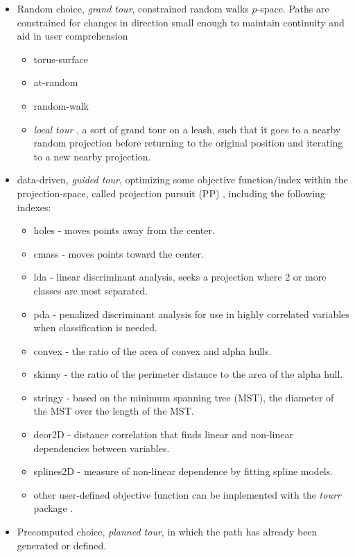 \documentclass{monashthesis}
\begin{document}
\begin{itemize}
\tightlist
\item
  Random choice, \emph{grand tour}, constrained random walks
  \(p\)-space. Paths are constrained for changes in direction small
  enough to maintain continuity and aid in user comprehension

  \begin{itemize}
  \tightlist
  \item
    torus-surface \autocite{asimov_grand_1985}
  \item
    at-random \autocite{asimov_grand_1985}
  \item
    random-walk \autocite{asimov_grand_1985}
  \item
    \emph{local tour} \autocite{wickham_tourr_2011}, a sort of grand
    tour on a leash, such that it goes to a nearby random projection
    before returning to the original position and iterating to a new
    nearby projection.
  \end{itemize}
\item
  data-driven, \emph{guided tour}, optimizing some objective
  function/index within the projection-space, called projection pursuit
  (PP) \autocite{hurley_analyzing_1990}, including the following
  indexes:

  \begin{itemize}
  \tightlist
  \item
    holes \autocite{cook_projection_1993} - moves points away from the
    center.
  \item
    cmass \autocite{cook_projection_1993} - moves points toward the
    center.
  \item
    lda \autocite{lee_projection_2005} - linear discriminant analysis,
    seeks a projection where 2 or more classes are most separated.
  \item
    pda \autocite{lee_projection_2010} - penalized discriminant analysis
    for use in highly correlated variables when classification is
    needed.
  \item
    convex \autocite{laa_using_2019} - the ratio of the area of convex
    and alpha hulls.
  \item
    skinny \autocite{laa_using_2019} - the ratio of the perimeter
    distance to the area of the alpha hull.
  \item
    stringy \autocite{laa_using_2019} - based on the minimum spanning
    tree (MST), the diameter of the MST over the length of the MST.
  \item
    dcor2D \autocites{grimm_mbgraphic:_2017}{laa_using_2019} - distance
    correlation that finds linear and non-linear dependencies between
    variables.
  \item
    splines2D \autocites{grimm_mbgraphic:_2017}{laa_using_2019} -
    measure of non-linear dependence by fitting spline models.
  \item
    other user-defined objective function can be implemented with the
    \emph{tourr} package \textcite{wickham_tourr_2011}.
  \end{itemize}
\item
  Precomputed choice, \emph{planned tour}, in which the path has already
  been generated or defined.


\end{itemize}
\end{document}
